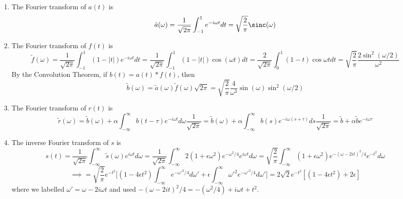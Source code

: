 \documentclass[a4paper]{article}
\begin{document}
\begin{ans}\leavevmode
\begin{enumerate}[label=(\alph*)]
\item The Fourier transform of $a(t)$ is
$$\tilde{a}(\omega)=\frac{1}{\sqrt{2\pi}}\int_{-1}^1e^{-i\omega t}dt=\sqrt{\frac{2}{\pi}}\sinc(\omega)$$
\item The Fourier transform of $f(t)$ is
$$\tilde{f}(\omega)=\frac{1}{\sqrt{2\pi}}\int_{-1}^1(1-|t|)e^{-i\omega t}dt=\frac{1}{\sqrt{2\pi}}\int_{-1}^1(1-|t|)\cos(\omega t)dt=\frac{2}{\sqrt{2\pi}}\int_0^1(1-t)\cos\omega tdt=\sqrt{\frac{2}{\pi}}\frac{2\sin^2(\omega/2)}{\omega^2}$$
By the Convolution Theorem, if $b(t)=a(t)*f(t)$, then $$\tilde{b}(\omega)=\tilde{a}(\omega)\tilde{f}(\omega)\sqrt{2\pi}=\sqrt{\frac{2}{\pi}}\frac{4}{\omega^3}\sin(\omega)\sin^2(\omega/2)$$
\item The Fourier transform of $r(t)$ is
$$\tilde{r}(\omega)=\tilde{b}(\omega)+\alpha\int_{-\infty}^\infty b(t-\tau)e^{-i\omega t}d\omega\frac{1}{\sqrt{2\pi}}=\tilde{b}(\omega)+\alpha\int_{-\infty}^\infty b(s)e^{-i\omega (s+\tau)}ds\frac{1}{\sqrt{2\pi}}=\tilde{b}+\alpha\tilde{b}e^{-i\omega\tau}$$
\item The inverse Fourier transform of $s$ is
$$s(t)=\frac{1}{\sqrt{2\pi}}\int_{-\infty}^\infty\tilde{s}(\omega)e^{i\omega t}d\omega=\frac{1}{\sqrt{2\pi}}\int_{-\infty}^\infty 2(1+\epsilon\omega^2)e^{-\omega^2/4}e^{i\omega t}d\omega=\sqrt{\frac{2}{\pi}}\int_{-\infty}^\infty(1+\epsilon\omega^2)e^{-(\omega-2it)^2/4}e^{-t^2}d\omega$$
$$\implies=\sqrt{\frac{2}{\pi}}e^{-t^2}\bigg[(1-4\epsilon t^2)\int_{-\infty}^\infty e^{-\omega'^2/4}d\omega'+\epsilon\int_{-\infty}^\infty\omega'^2e^{-\omega'^2/4}d\omega'\bigg]=2\sqrt{2}e^{-t^2}[(1-4\epsilon t^2)+2\epsilon]$$
where we labelled $\omega'=\omega-2i\omega t$ and used $-(\omega-2it)^2/4=-(\omega^2/4)+i\omega t+t^2$.
\end{enumerate}
\end{ans}
\newpage
\end{document}
